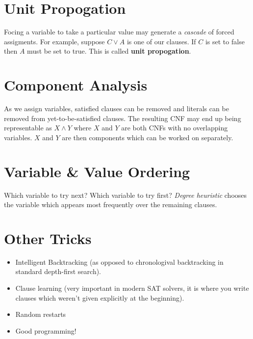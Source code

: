 \documentclass[11pt]{article}
\begin{document}
\section{Unit Propogation}
\label{sec:org17e6f87}
Focing a variable to take a particular value may generate a \emph{cascade} of forced assigments.
For example, suppose \(C \lor A\) is one of our clauses.
If \(C\) is set to false then \(A\) must be set to true.
This is called \textbf{unit propogation}.

\section{Component Analysis}
\label{sec:org55b2faa}
As we assign variables, satisfied clauses can be removed and literals can be removed from yet-to-be-satisfied clauses.
The resulting CNF may end up being representable as \(X \land Y\) where \(X\) and \(Y\) are both CNFs with no overlapping variables.
\(X\) and \(Y\) are then components which can be worked on separately.

\section{Variable \& Value Ordering}
\label{sec:orgc13fba5}
Which variable to try next? Which variable to try first?
\emph{Degree heuristic} chooses the variable which appears most frequently over the remaining clauses.

\section{Other Tricks}
\label{sec:orgcf59b2b}
\begin{itemize}
\item Intelligent Backtracking (as opposed to chronologival backtracking in standard depth-first search).
\item Clause learning (very important in modern SAT solvers, it is where you write clauses which weren't given explicitly at the beginning).
\item Random restarts
\item Good programming!
\end{itemize}
\end{document}
